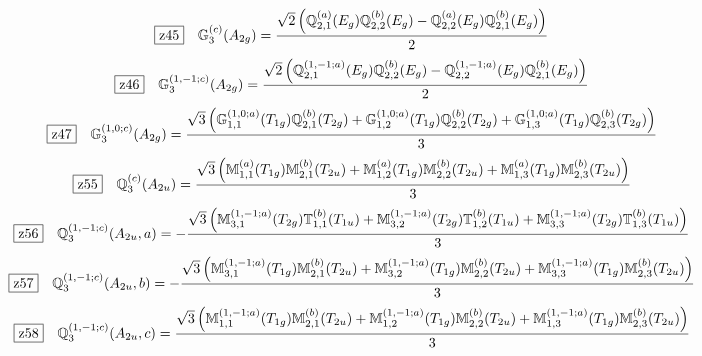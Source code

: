 \documentclass[fleqn,10pt,landscape]{jsarticle}
\begin{document}
\begin{dmath*}
\hspace*{3mm}\fbox{z45}\quad \mathbb{G}_{3}^{(c)}(A_{2g})=\frac{\sqrt{2} \left(\mathbb{Q}_{2,1}^{(a)}(E_{g}) \mathbb{Q}_{2,2}^{(b)}(E_{g}) - \mathbb{Q}_{2,2}^{(a)}(E_{g}) \mathbb{Q}_{2,1}^{(b)}(E_{g})\right)}{2}
\end{dmath*}
\begin{dmath*}
\hspace*{3mm}\fbox{z46}\quad \mathbb{G}_{3}^{(1,-1;c)}(A_{2g})=\frac{\sqrt{2} \left(\mathbb{Q}_{2,1}^{(1,-1;a)}(E_{g}) \mathbb{Q}_{2,2}^{(b)}(E_{g}) - \mathbb{Q}_{2,2}^{(1,-1;a)}(E_{g}) \mathbb{Q}_{2,1}^{(b)}(E_{g})\right)}{2}
\end{dmath*}
\begin{dmath*}
\hspace*{3mm}\fbox{z47}\quad \mathbb{G}_{3}^{(1,0;c)}(A_{2g})=\frac{\sqrt{3} \left(\mathbb{G}_{1,1}^{(1,0;a)}(T_{1g}) \mathbb{Q}_{2,1}^{(b)}(T_{2g}) + \mathbb{G}_{1,2}^{(1,0;a)}(T_{1g}) \mathbb{Q}_{2,2}^{(b)}(T_{2g}) + \mathbb{G}_{1,3}^{(1,0;a)}(T_{1g}) \mathbb{Q}_{2,3}^{(b)}(T_{2g})\right)}{3}
\end{dmath*}
\begin{dmath*}
\hspace*{3mm}\fbox{z55}\quad \mathbb{Q}_{3}^{(c)}(A_{2u})=\frac{\sqrt{3} \left(\mathbb{M}_{1,1}^{(a)}(T_{1g}) \mathbb{M}_{2,1}^{(b)}(T_{2u}) + \mathbb{M}_{1,2}^{(a)}(T_{1g}) \mathbb{M}_{2,2}^{(b)}(T_{2u}) + \mathbb{M}_{1,3}^{(a)}(T_{1g}) \mathbb{M}_{2,3}^{(b)}(T_{2u})\right)}{3}
\end{dmath*}
\begin{dmath*}
\hspace*{3mm}\fbox{z56}\quad \mathbb{Q}_{3}^{(1,-1;c)}(A_{2u},a)=- \frac{\sqrt{3} \left(\mathbb{M}_{3,1}^{(1,-1;a)}(T_{2g}) \mathbb{T}_{1,1}^{(b)}(T_{1u}) + \mathbb{M}_{3,2}^{(1,-1;a)}(T_{2g}) \mathbb{T}_{1,2}^{(b)}(T_{1u}) + \mathbb{M}_{3,3}^{(1,-1;a)}(T_{2g}) \mathbb{T}_{1,3}^{(b)}(T_{1u})\right)}{3}
\end{dmath*}
\begin{dmath*}
\hspace*{3mm}\fbox{z57}\quad \mathbb{Q}_{3}^{(1,-1;c)}(A_{2u},b)=- \frac{\sqrt{3} \left(\mathbb{M}_{3,1}^{(1,-1;a)}(T_{1g}) \mathbb{M}_{2,1}^{(b)}(T_{2u}) + \mathbb{M}_{3,2}^{(1,-1;a)}(T_{1g}) \mathbb{M}_{2,2}^{(b)}(T_{2u}) + \mathbb{M}_{3,3}^{(1,-1;a)}(T_{1g}) \mathbb{M}_{2,3}^{(b)}(T_{2u})\right)}{3}
\end{dmath*}
\begin{dmath*}
\hspace*{3mm}\fbox{z58}\quad \mathbb{Q}_{3}^{(1,-1;c)}(A_{2u},c)=\frac{\sqrt{3} \left(\mathbb{M}_{1,1}^{(1,-1;a)}(T_{1g}) \mathbb{M}_{2,1}^{(b)}(T_{2u}) + \mathbb{M}_{1,2}^{(1,-1;a)}(T_{1g}) \mathbb{M}_{2,2}^{(b)}(T_{2u}) + \mathbb{M}_{1,3}^{(1,-1;a)}(T_{1g}) \mathbb{M}_{2,3}^{(b)}(T_{2u})\right)}{3}
\end{dmath*}
\end{document}
